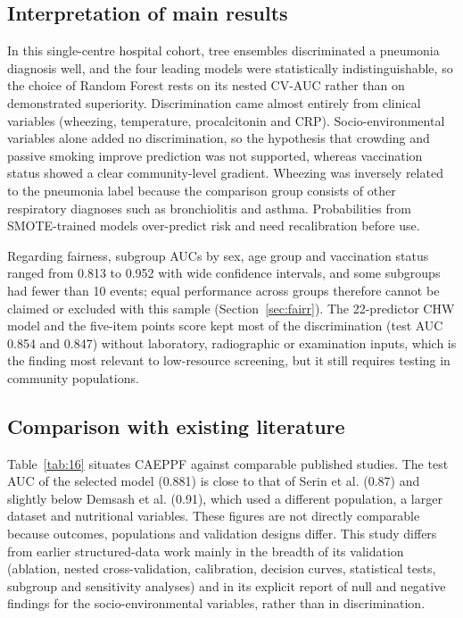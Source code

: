 \documentclass[a4paper,fleqn]{cas-dc}
\begin{document}
\subsection{Interpretation of main results}
\label{sec:interp}

In this single-centre hospital cohort, tree ensembles discriminated a pneumonia diagnosis well, and the four leading models were statistically indistinguishable, so the choice of Random Forest rests on its nested CV-AUC rather than on demonstrated superiority. Discrimination came almost entirely from clinical variables (wheezing, temperature, procalcitonin and CRP). Socio-environmental variables alone added no discrimination, so the hypothesis that crowding and passive smoking improve prediction was not supported, whereas vaccination status showed a clear community-level gradient. Wheezing was inversely related to the pneumonia label because the comparison group consists of other respiratory diagnoses such as bronchiolitis and asthma. Probabilities from SMOTE-trained models over-predict risk and need recalibration before use.

Regarding fairness, subgroup AUCs by sex, age group and vaccination status ranged from 0.813 to 0.952 with wide confidence intervals, and some subgroups had fewer than 10 events; equal performance across groups therefore cannot be claimed or excluded with this sample (Section~\ref{sec:fairr}). The 22-predictor CHW model and the five-item points score kept most of the discrimination (test AUC 0.854 and 0.847) without laboratory, radiographic or examination inputs, which is the finding most relevant to low-resource screening, but it still requires testing in community populations.

\subsection{Comparison with existing literature}
\label{sec:lit}

Table~\ref{tab:16} situates CAEPPF against comparable published studies. The test AUC of the selected model (0.881) is close to that of Serin et al. (0.87) and slightly below Demsash et al. (0.91), which used a different population, a larger dataset and nutritional variables. These figures are not directly comparable because outcomes, populations and validation designs differ. This study differs from earlier structured-data work mainly in the breadth of its validation (ablation, nested cross-validation, calibration, decision curves, statistical tests, subgroup and sensitivity analyses) and in its explicit report of null and negative findings for the socio-environmental variables, rather than in discrimination.
\end{document}
